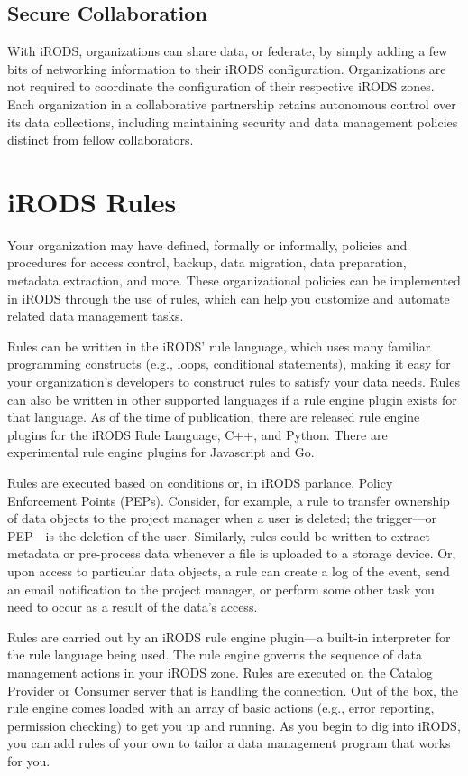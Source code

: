 \documentclass[10pt,oneside]{memoir}
\begin{document}
\subsection{Secure Collaboration}

With iRODS, organizations can share data, or federate, by simply adding a few bits of networking information to their iRODS configuration. Organizations are not required to coordinate the configuration of their respective iRODS zones. Each organization in a collaborative partnership retains autonomous control over its data collections, including maintaining security and data management policies distinct from fellow collaborators.

\section{iRODS Rules}

Your organization may have defined, formally or informally, policies and procedures for access control, backup, data migration, data preparation, metadata extraction, and more. These organizational policies can be implemented in iRODS through the use of rules, which can help you customize and automate related data management tasks.

Rules can be written in the iRODS' rule language, which uses many familiar programming constructs (e.g., loops, conditional statements), making it easy for your organization's developers to construct rules to satisfy your data needs.  Rules can also be written in other supported languages if a rule engine plugin exists for that language.  As of the time of publication, there are released rule engine plugins for the iRODS Rule Language, C++, and Python.  There are experimental rule engine plugins for Javascript and Go.

Rules are executed based on conditions or, in iRODS parlance, Policy Enforcement Points (PEPs). Consider, for example, a rule to transfer ownership of data objects to the project manager when a user is deleted; the trigger---or PEP---is the deletion of the user. Similarly, rules could be written to extract metadata or pre-process data whenever a file is uploaded to a storage device. Or, upon access to particular data objects, a rule can create a log of the event, send an email notification to the project manager, or perform some other task you need to occur as a result of the data's access.

Rules are carried out by an iRODS rule engine plugin---a built-in interpreter for the rule language being used. The rule engine governs the sequence of data management actions in your iRODS zone. Rules are executed on the Catalog Provider or Consumer server that is handling the connection. Out of the box, the rule engine comes loaded with an array of basic actions (e.g., error reporting, permission checking) to get you up and running. As you begin to dig into iRODS, you can add rules of your own to tailor a data management program that works for you.
\end{document}

